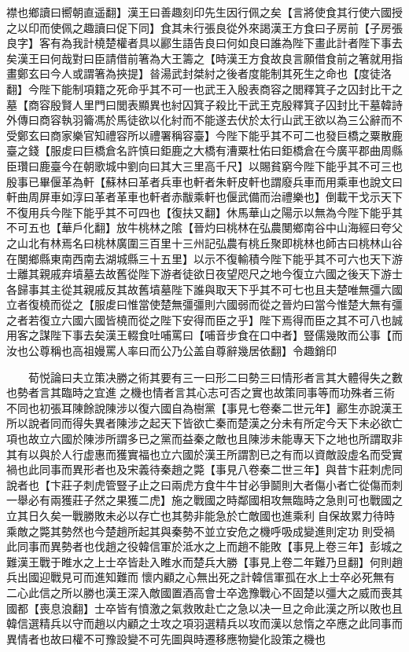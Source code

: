 襟也鄉讀曰嚮朝直遥翻】漢王曰善趣刻印先生因行佩之矣【言將使食其行使六國授之以印而使佩之趣讀曰促下同】食其未行張良從外來謁漢王方食曰子房前【子房張良字】客有為我計橈楚權者具以酈生語告良曰何如良曰誰為陛下畫此計者陛下事去矣漢王曰何哉對曰臣請借前箸為大王籌之【時漢王方食故良言願借食前之箸就用指畫鄭玄曰今人或謂箸為挾提】㫺湯武封桀紂之後者度能制其死生之命也【度徒洛翻】今陛下能制項籍之死命乎其不可一也武王入殷表商容之閭釋箕子之囚封比干之墓【商容殷賢人里門曰閭表顯異也紂囚箕子殺比干武王克殷釋箕子囚封比干墓韓詩外傳曰商容執羽籥馮於馬徒欲以化紂而不能遂去伏於太行山武王欲以為三公辭而不受鄭玄曰商家樂官知禮容所以禮署稱容臺】今陛下能乎其不可二也發巨橋之粟散鹿臺之錢【服䖍曰巨橋倉名許慎曰鉅鹿之大橋有漕粟杜佑曰鉅橋倉在今廣平郡曲周縣臣瓚曰鹿臺今在朝歌城中劉向曰其大三里高千尺】以賜貧窮今陛下能乎其不可三也殷事已畢偃革為軒【蘇林曰革者兵車也軒者朱軒皮軒也謂廢兵車而用乘車也說文曰軒曲周屏車如淳曰革者革車也軒者赤黻乘軒也偃武備而治禮樂也】倒載干戈示天下不復用兵今陛下能乎其不可四也【復扶又翻】休馬華山之陽示以無為今陛下能乎其不可五也【華戶化翻】放牛桃林之隂【晉灼曰桃林在弘農閺鄉南谷中山海經曰夸父之山北有林焉名曰桃林廣圍三百里十三州記弘農有桃丘聚即桃林也師古曰桃林山谷在閺鄉縣東南西南去湖城縣三十五里】以示不復輸積今陛下能乎其不可六也天下游士離其親戚弃墳墓去故舊從陛下游者徒欲日夜望咫尺之地今復立六國之後天下游士各歸事其主從其親戚反其故舊墳墓陛下誰與取天下乎其不可七也且夫楚唯無彊六國立者復橈而從之【服䖍曰惟當使楚無彊彊則六國弱而從之晉灼曰當今惟楚大無有彊之者若復立六國六國皆橈而從之陛下安得而臣之乎】陛下焉得而臣之其不可八也誠用客之謀陛下事去矣漢王輟食吐哺罵曰【哺音步食在口中者】豎儒幾敗而公事【而汝也公尊稱也高祖嫚罵人率曰而公乃公盖自尊辭幾居依翻】令趣銷印

　　荀悦論曰夫立策决勝之術其要有三一曰形二曰勢三曰情形者言其大體得失之數也勢者言其臨時之宜進之機也情者言其心志可否之實也故策同事等而功殊者三術不同也初張耳陳餘說陳涉以復六國自為樹黨【事見七卷秦二世元年】酈生亦說漢王所以說者同而得失異者陳涉之起天下皆欲亡秦而楚漢之分未有所定今天下未必欲亡項也故立六國於陳涉所謂多已之黨而益秦之敵也且陳涉未能專天下之地也所謂取非其有以與於人行虚惠而獲實福也立六國於漢王所謂割已之有而以資敵設虛名而受實禍也此同事而異形者也及宋義待秦趙之斃【事見八卷秦二世三年】與昔卞莊刺虎同說者也【卞莊子刺虎管豎子止之曰兩虎方食牛牛甘必爭鬬則大者傷小者亡從傷而刺一舉必有兩獲莊子然之果獲二虎】施之戰國之時鄰國相攻無臨時之急則可也戰國之立其日久矣一戰勝敗未必以存亡也其勢非能急於亡敵國也進乘利自保故累力待時乘敵之斃其勢然也今楚趙所起其與秦勢不並立安危之機呼吸成變進則定功則受禍此同事而異勢者也伐趙之役韓信軍於泜水之上而趙不能敗【事見上卷三年】彭城之難漢王戰于睢水之上士卒皆赴入睢水而楚兵大勝【事見上卷二年難乃旦翻】何則趙兵出國迎戰見可而進知難而懷内顧之心無出死之計韓信軍孤在水上士卒必死無有二心此信之所以勝也漢王深入敵國置酒高會士卒逸豫戰心不固楚以彊大之威而喪其國都【喪息浪翻】士卒皆有憤激之氣救敗赴亡之急以决一旦之命此漢之所以敗也且韓信選精兵以守而趙以内顧之士攻之項羽選精兵以攻而漢以怠惰之卒應之此同事而異情者也故曰權不可豫設變不可先圖與時遷移應物變化設策之機也

